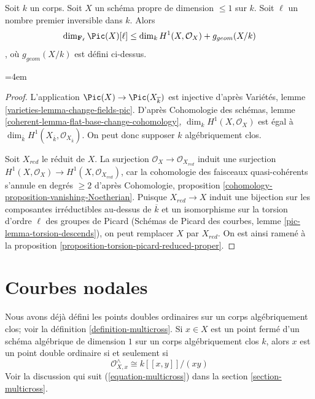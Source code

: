\begin{lemma}
\label{lemma-bound-torsion-simple}
Soit $k$ un corps. Soit $X$ un schéma propre de dimension $\leq 1$ sur $k$. Soit $\ell$ un nombre premier inversible dans $k$. Alors $$
\dim_{\mathbf{F}_\ell} \Pic(X)[\ell] \leq
\dim_k H^1(X, \mathcal{O}_X) + g_{geom}(X/k)
$$, où $g_{geom}(X/k)$ est défini ci-dessus.
\end{lemma}

\begingroup\emergencystretch=4em
\begin{proof}
L'application $\Pic(X) \to \Pic(X_{\overline{k}})$ est injective d'après Variétés, lemme \ref{varieties-lemma-change-fields-pic}. D'après Cohomologie des schémas, lemme \ref{coherent-lemma-flat-base-change-cohomology}, $\dim_k H^1(X, \mathcal{O}_X)$ est égal à $\dim_{\overline{k}} H^1(X_{\overline{k}}, \mathcal{O}_{X_{\overline{k}}})$. On peut donc supposer $k$ algébriquement clos.

\medskip\noindent
Soit $X_{red}$ le réduit de $X$. La surjection $\mathcal{O}_X \to \mathcal{O}_{X_{red}}$ induit une surjection $H^1(X, \mathcal{O}_X) \to H^1(X, \mathcal{O}_{X_{red}})$, car la cohomologie des faisceaux quasi-cohérents s'annule en degrés $\geq 2$ d'après Cohomologie, proposition \ref{cohomology-proposition-vanishing-Noetherian}. Puisque $X_{red} \to X$ induit une bijection sur les composantes irréductibles au-dessus de $\overline{k}$ et un isomorphisme sur la torsion d'ordre $\ell$ des groupes de Picard (Schémas de Picard des courbes, lemme \ref{pic-lemma-torsion-descends}), on peut remplacer $X$ par $X_{red}$. On est ainsi ramené à la proposition \ref{proposition-torsion-picard-reduced-proper}.
\end{proof}
\endgroup






\section{Courbes nodales}
\label{section-nodal}

\noindent
Nous avons déjà défini les points doubles ordinaires sur un corps algébriquement clos; voir la définition \ref{definition-multicross}. Si $x \in X$ est un point fermé d'un schéma algébrique de dimension $1$ sur un corps algébriquement clos $k$, alors $x$ est un point double ordinaire si et seulement si $$
\mathcal{O}_{X, x}^\wedge \cong k[[x, y]]/(xy)
$$ Voir la discussion qui suit (\ref{equation-multicross}) dans la section \ref{section-multicross}.

